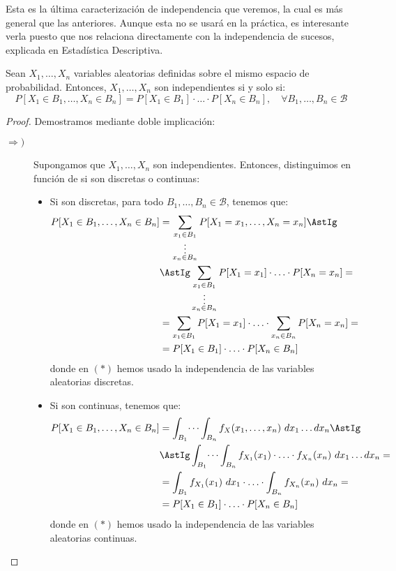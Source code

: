 Esta es la última caracterización de independencia que veremos, la cual es más general que las anteriores. Aunque esta no se usará en la práctica, es interesante verla puesto que nos relaciona directamente con la independencia de sucesos, explicada en Estadística Descriptiva.
\begin{prop}
    Sean $X_1, \ldots, X_n$ variables aleatorias definidas sobre el mismo espacio de probabilidad. Entonces, $X_1, \ldots, X_n$ son independientes si y solo si:
    \[
        P[X_1 \in B_1, \ldots, X_n \in B_n] = P[X_1 \in B_1] \cdot \ldots \cdot P[X_n \in B_n], \quad \forall B_1, \ldots, B_n \in \mathcal{B}
    \]
\end{prop}
\begin{proof}
    Demostramos mediante doble implicación:
    \begin{description}
        \item[$\Longrightarrow)$] Supongamos que $X_1, \ldots, X_n$ son independientes. Entonces, distinguimos en función de si son discretas o continuas:
        \begin{itemize}
            \item Si son discretas, para todo $B_1, \ldots, B_n \in \mathcal{B}$, tenemos que:
            \begin{align*}
                P[X_1 \in B_1, \ldots, X_n \in B_n] &= \sum_{\substack{x_1 \in B_1\\ \vdots \\ x_n \in B_n}} P[X_1 = x_1, \ldots, X_n = x_n]
                \AstIg \\ &\AstIg
                \sum_{\substack{x_1 \in B_1\\ \vdots \\ x_n \in B_n}} P[X_1 = x_1] \cdot \ldots \cdot P[X_n = x_n]
                =\\&= \sum_{x_1 \in B_1} P[X_1 = x_1] \cdot \ldots \cdot \sum_{x_n \in B_n} P[X_n = x_n]
                =\\&= P[X_1 \in B_1] \cdot \ldots \cdot P[X_n \in B_n]
            \end{align*}
            donde en $(\ast)$ hemos usado la independencia de las variables aleatorias discretas.
            \item Si son continuas, tenemos que:
            \begin{align*}
                P[X_1 \in B_1, \ldots, X_n \in B_n] &= \int_{B_1} \dots \int_{B_n} f_X(x_1, \ldots, x_n) \ dx_1 \dots dx_n
                \AstIg\\& \AstIg \int_{B_1} \dots \int_{B_n} f_{X_1}(x_1) \cdot \ldots \cdot f_{X_n}(x_n) \ dx_1 \dots dx_n
                =\\&= \int_{B_1} f_{X_1}(x_1) \ dx_1 \cdot \ldots \cdot \int_{B_n} f_{X_n}(x_n) \ dx_n
                =\\&= P[X_1 \in B_1] \cdot \ldots \cdot P[X_n \in B_n]
            \end{align*}
            donde en $(\ast)$ hemos usado la independencia de las variables aleatorias continuas.
        \end{itemize}


\end{description}
\end{proof}
